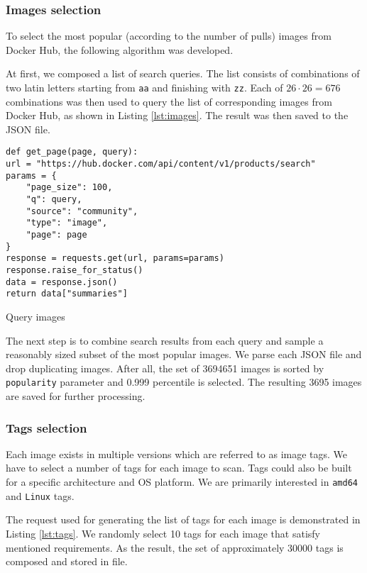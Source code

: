 \subsubsection{Images selection}

To select the most popular (according to the number of pulls) images from Docker Hub, the following algorithm was developed.

At first, we composed a list of search queries. The list consists of combinations of two latin letters starting from \texttt{aa} and finishing with \texttt{zz}. Each of $26 \cdot 26 = 676$ combinations was then used to query the list of corresponding images from Docker Hub, as shown in Listing \ref{lst:images}. The result was then saved to the JSON file.
\begin{listing}[htp]
    \centering
    \begin{minipage}{0.8\linewidth}
        \begin{verbatim}
def get_page(page, query):
url = "https://hub.docker.com/api/content/v1/products/search"
params = {
    "page_size": 100,
    "q": query,
    "source": "community",
    "type": "image",
    "page": page
}
response = requests.get(url, params=params)
response.raise_for_status()
data = response.json()
return data["summaries"]
        \end{verbatim}
    \end{minipage}
    \caption{Query images}
    \label{lst:images}
\end{listing}

The next step is to combine search results from each query and sample a reasonably sized subset of the most popular images. We parse each JSON file and drop duplicating images. After all, the set of 3694651 images is sorted by \texttt{popularity} parameter and 0.999 percentile is selected. The resulting 3695 images are saved for further processing.

\subsubsection{Tags selection}

Each image exists in multiple versions which are referred to as image tags. We have to select a number of tags for each image to scan. Tags could also be built for a specific architecture and OS platform. We are primarily interested in \texttt{amd64} and \texttt{Linux} tags. 

The request used for generating the list of tags for each image is demonstrated in Listing \ref{lst:tags}. We randomly select 10 tags for each image that satisfy mentioned requirements. As the result, the set of approximately 30000 tags is composed and stored in file.

